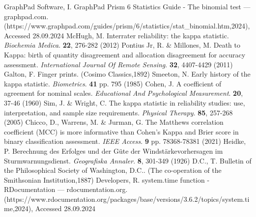 \documentclass[sn-mathphys-num]{sn-jnl}%
\begin{document}
\begin{thebibliography}{000}
GraphPad Software, I. GraphPad Prism 6 Statistics Guide - The binomial test — graphpad.com. (https://www.graphpad.com/guides/prism/6/statistics/stat_binomial.htm,2024), Accessed 28.09.2024
McHugh, M. Interrater reliability: the kappa statistic. {\em Biochemia Medica}. \textbf{22}, 276-282 (2012)
Pontius Jr, R. \& Millones, M. Death to Kappa: birth of quantity disagreement and allocation disagreement for accuracy assessment. {\em International Journal Of Remote Sensing}. \textbf{32}, 4407-4429 (2011)
Galton, F. Finger prints. (Cosimo Classics,1892)
Smeeton, N. Early history of the kappa statistic. {\em Biometrics}. \textbf{41} pp. 795 (1985)
Cohen, J. A coefficient of agreement for nominal scales. {\em Educational And Psychological Measurement}. \textbf{20}, 37-46 (1960)
Sim, J. \& Wright, C. The kappa statistic in reliability studies: use, interpretation, and sample size requirements. {\em Physical Therapy}. \textbf{85}, 257-268 (2005)
Chicco, D., Warrens, M. \& Jurman, G. The Matthews correlation coefficient (MCC) is more informative than Cohen's Kappa and Brier score in binary classification assessment. {\em IEEE Access}. \textbf{9} pp. 78368-78381 (2021)
Heidke, P. Berechnung des Erfolges und der Güte der Windstärkevorhersagen im Sturmwarnungsdienst. {\em Geografiska Annaler}. \textbf{8}, 301-349 (1926)
D.C., T. Bulletin of the Philosophical Society of Washington, D.C.. (The co-operation of the Smithsonian Institution,1887)
Developers, R. system.time function - RDocumentation — rdocumentation.org. (https://www.rdocumentation.org/packages/base/versions/3.6.2/topics/system.time,2024), Accessed 28.09.2024

\end{thebibliography}
\end{document}
